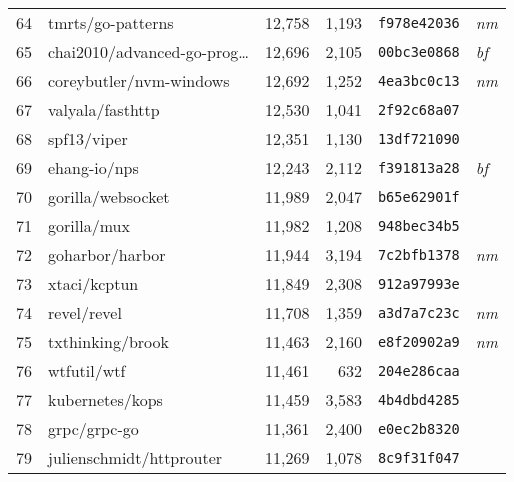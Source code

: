 {\begin{supertabular}{llrrll}
        64  &                  tmrts/go-patterns & 12,758 &  1,193 &  \texttt{f978e42036} &  \textit{nm} \\
        65  &    chai2010/advanced-go-prog\ldots & 12,696 &  2,105 &  \texttt{00bc3e0868} &  \textit{bf} \\
        66  &            coreybutler/nvm-windows & 12,692 &  1,252 &  \texttt{4ea3bc0c13} &  \textit{nm} \\
        67  &                   valyala/fasthttp & 12,530 &  1,041 &  \texttt{2f92c68a07} &              \\
        68  &                        spf13/viper & 12,351 &  1,130 &  \texttt{13df721090} &              \\
        69  &                       ehang-io/nps & 12,243 &  2,112 &  \texttt{f391813a28} &  \textit{bf} \\
        70  &                  gorilla/websocket & 11,989 &  2,047 &  \texttt{b65e62901f} &              \\
        71  &                        gorilla/mux & 11,982 &  1,208 &  \texttt{948bec34b5} &              \\
        72  &                    goharbor/harbor & 11,944 &  3,194 &  \texttt{7c2bfb1378} &  \textit{nm} \\
        73  &                       xtaci/kcptun & 11,849 &  2,308 &  \texttt{912a97993e} &              \\
        74  &                        revel/revel & 11,708 &  1,359 &  \texttt{a3d7a7c23c} &  \textit{nm} \\
        75  &                   txthinking/brook & 11,463 &  2,160 &  \texttt{e8f20902a9} &  \textit{nm} \\
        76  &                        wtfutil/wtf & 11,461 &    632 &  \texttt{204e286caa} &              \\
        77  &                    kubernetes/kops & 11,459 &  3,583 &  \texttt{4b4dbd4285} &              \\
        78  &                       grpc/grpc-go & 11,361 &  2,400 &  \texttt{e0ec2b8320} &              \\
        79  &           julienschmidt/httprouter & 11,269 &  1,078 &  \texttt{8c9f31f047} &              \\

\end{supertabular}}
